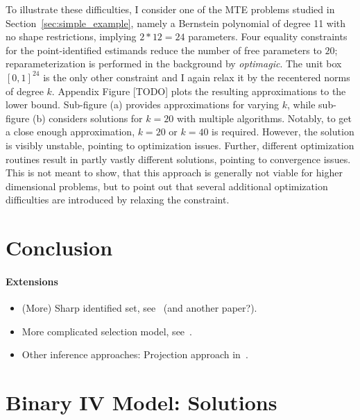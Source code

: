 \documentclass[12pt,a4paper,english]{article} %
\numberwithin{equation}{section}
\theoremstyle{definition}
\theoremstyle{remark}
\theoremstyle{plain}
\begin{document}
To illustrate these difficulties, I consider one of the MTE problems studied in Section~\ref{sec:simple_example}, namely a Bernstein polynomial of degree 11 with no shape restrictions, implying $2*12=24$ parameters.
Four equality constraints for the point-identified estimands reduce the number of free parameters to $20$; reparameterization is performed in the background by \textit{optimagic}.
The unit box $[0,1]^{24}$ is the only other constraint and I again relax it by the recentered norms of degree $k$.
Appendix Figure [TODO] plots the resulting approximations to the lower bound.
Sub-figure (a) provides approximations for varying $k$, while sub-figure (b) considers solutions for $k=20$ with multiple algorithms.
Notably, to get a close enough approximation, $k=20$ or $k=40$ is required. However, the solution is visibly unstable, pointing to optimization issues.
Further, different optimization routines result in partly vastly different solutions, pointing to convergence issues.
This is not meant to show, that this approach is generally not viable for higher dimensional problems, but to point out that several additional optimization difficulties are introduced by relaxing the constraint.


\section{Conclusion}

\paragraph{Extensions}
\begin{itemize}
  \item (More) Sharp identified set, see~\cite{marx2024sharp} (and another paper?).
  \item More complicated selection model, see~\cite{dutz2021selection}.
  \item Other inference approaches: Projection approach in~\cite{bei2023inference}.
\end{itemize}

\clearpage
\newpage






\appendix
{}


\section{Binary IV Model: Solutions}
\end{document}
